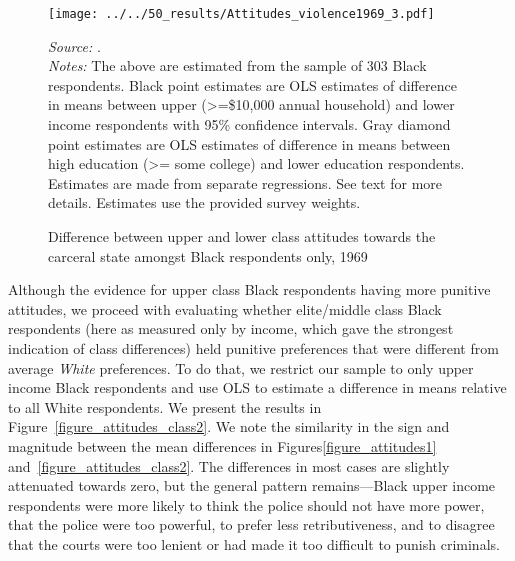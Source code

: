 \documentclass[12pt]{article}
\begin{document}
\begin{figure}[h!]
 \begin{center}
 \caption{Difference between upper and lower class attitudes towards the carceral state amongst Black respondents only, 1969}
 \small
		 \texttt{[image: ../../50\_results/Attitudes\_violence1969\_3.pdf]}
 \label{figure_attitudes2}
 	\end{center}
 	{\scriptsize{\emph{Source:} \cite{Violence1969}. }} \\
	{\scriptsize{\emph{Notes:} The above are estimated from the sample of 303 Black respondents.  Black point estimates are OLS estimates of difference in means between upper (>=\$10,000 annual household) and lower income respondents with 95\% confidence intervals. Gray diamond point estimates are OLS estimates of difference in means between high education (>= some college) and lower education respondents.  Estimates are made from separate regressions.  See text for more details.  Estimates use the provided survey weights.  \singlespacing }}
\end{figure} \normalsize

Although the evidence for upper class Black respondents having more punitive attitudes, we proceed with evaluating whether elite/middle class Black respondents (here as measured only by income, which gave the strongest indication of class differences) held punitive preferences that were different from average \emph{White} preferences.  To do that, we restrict our sample to only upper income Black respondents and use OLS to estimate a difference in means relative to all White respondents.  We present the results in Figure~\ref{figure_attitudes_class2}.  We note the similarity in the sign and magnitude between the mean differences in Figures\ref{figure_attitudes1} and~\ref{figure_attitudes_class2}.  The differences in most cases are slightly attenuated towards zero, but the general pattern remains---Black upper income respondents were more likely to think the police should not have more power, that the police were too powerful, to prefer less retributiveness, and to disagree that the courts were too lenient or had made it too difficult to punish criminals.
\end{document}
